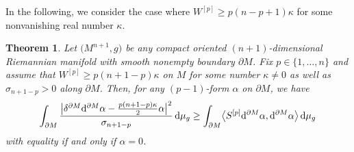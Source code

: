 \documentclass[pdftex]{sigma}
\numberwithin{equation}{section}
\newtheorem{Theorem}{Theorem}[section]
\begin{document}
In the following, we consider the case where $W^{[p]}\geq p(n-p+1)\kappa$ for some nonvanishing real number $\kappa$.

\begin{Theorem}\label{thm:ineomegabiggerk}
Let $\bigl(M^{n+1},g\bigr)$ be any compact oriented $(n+1)$-dimensional Riemannian manifold with smooth nonempty boundary $\partial M$.
Fix $p\in\{1,\dots,n\}$ and assume that $W^{[p]}\geq p(n+1-p)\kappa$ on $M$ for some number $\kappa\neq0$ as well as $\sigma_{n+1-p}>0$ along $\partial M$.
Then, for any  $(p-1)$-form $\alpha$ on $\partial M$, we have
\begin{equation*}
\int_{\partial M}\frac{\bigl|\delta^{\partial M}{\rm d}^{\partial M}\alpha-\frac{p(n+1-p)\kappa}{2}\alpha\bigr|^2}{\sigma_{n+1-p}}\,{\rm d}\mu_g\geq\int_{\partial M}\bigl\langle S^{[p]}{\rm d}^{\partial M}\alpha,{\rm d}^{\partial M}\alpha\bigr\rangle\,{\rm d}\mu_g
\end{equation*}
with equality if and only if $\alpha=0$.
\end{Theorem}
\end{document}
